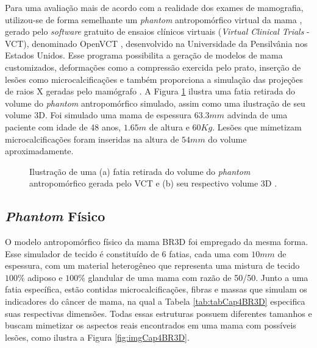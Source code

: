 Para uma avaliação mais de acordo com a realidade dos exames de mamografia, utilizou-se de forma semelhante um \textit{phantom} antropomórfico virtual da mama \cite{bakic2002mammogram1,bakic2002mammogram2,bakic2003mammogram}, gerado pelo \textit{software} gratuito de ensaios clínicos virtuais (\textit{Virtual Clinical Trials} - \acs{VCT}), denominado OpenVCT \cite{BakicVCT}, desenvolvido na Universidade da Pensilvânia nos Estados Unidos. Esse programa possibilita a geração de modelos de mama customizados, deformações como a compressão exercida pelo prato, inserção de lesões como microcalcificações e também proporciona a simulação das projeções de raios X geradas pelo mamógrafo \cite{barufaldi2018openvct}. A Figura \ref{fig:imgCap4PhantomVCT} ilustra uma fatia retirada do volume do \textit{phantom} antropomórfico simulado, assim como uma ilustração de seu volume \acs{3D}. Foi simulado uma mama de espessura $63.3mm$ advinda de uma paciente com idade de 48 anos, $1.65m$ de altura e $60Kg$. Lesões que mimetizam microcalcificações foram inseridas na altura de $54mm$ do volume aproximadamente. 

\begin{figure}[H]
	\centering
	
	\caption{Ilustração de uma (a) fatia retirada do volume do \textit{phantom} antropomórfico gerada pelo \acs{VCT} e (b) seu respectivo volume \acs{3D} .}
	
	\hfil
	\hfil

	\label{fig:imgCap4PhantomVCT}
\end{figure}

\subsection{\textit{Phantom} Físico}

 O modelo antropomórfico físico da mama BR3D \cite{PhantomBR3D} foi empregado da mesma forma. Esse simulador de tecido é constituído de 6 fatias, cada uma com $10mm$ de espessura, com um material heterogêneo que representa uma mistura de tecido $100\%$ adiposo e $100\%$ glandular de uma mama com razão de 50/50. Junto a uma fatia específica, estão contidas microcalcificações, fibras e massas que simulam os indicadores do câncer de mama, na qual a Tabela \ref{tab:tabCap4BR3D} especifica suas respectivas dimensões. Todas essas estruturas possuem diferentes tamanhos e buscam mimetizar os aspectos reais encontrados em uma mama com possíveis lesões, como ilustra a Figura \ref{fig:imgCap4BR3D}.
 
